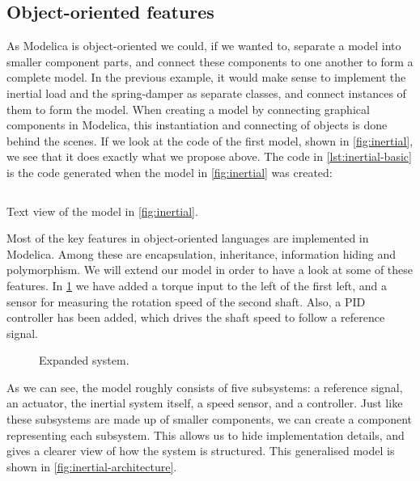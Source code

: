 \documentclass[\rootfolder/main.tex]{subfiles}
\begin{document}
\subsection{Object-oriented features}

As Modelica is object-oriented we could, if we wanted to, separate a model into smaller component parts, and connect these components to one another to form a complete model.
In the previous example, it would make sense to implement the inertial load and the spring-damper as separate classes, and connect instances of them to form the model.
When creating a model by connecting graphical components in Modelica, this instantiation and connecting of objects is done behind the scenes.
If we look at the code of the first model, shown in \cref{fig:inertial}, we see that it does exactly what we propose above.
The code in \cref{lst:inertial-basic} is the code generated when the model in \cref{fig:inertial} was created\footnotemark:


\begin{listing}[ht]
    \inputminted[fontsize=\footnotesize]{Modelica}{\rootfolder/Models/MasterProject/Models/InertialBasic.mo}
    \caption{Text view of the model in \cref{fig:inertial}.\label{lst:inertial-basic}}
\end{listing}

Most of the key features in object-oriented languages are implemented in Modelica.
Among these are encapsulation, inheritance, information hiding and polymorphism.
We will extend our model in order to have a look at some of these features.
In \cref{fig:inertial-expanded} we have added a torque input to the left of the first left, and a sensor for measuring the rotation speed of the second shaft.
Also, a PID controller has been added, which drives the shaft speed to follow a reference signal.

\begin{figure}[ht]
    \caption{Expanded system.\label{fig:inertial-expanded}}
\end{figure}

As we can see, the model roughly consists of five subsystems: a reference signal, an actuator, the inertial system itself, a speed sensor, and a controller.
Just like these subsystems are made up of smaller components, we can create a component representing each subsystem.
This allows us to hide implementation details, and gives a clearer view of how the system is structured.
This generalised model is shown in \cref{fig:inertial-architecture}.
\end{document}
